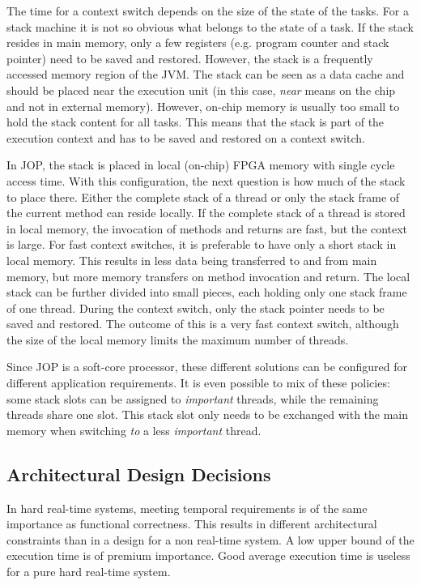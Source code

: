 The time for a context switch depends on the size of the state of
the tasks. For a stack machine it is not so obvious what belongs to
the state of a task. If the stack resides in main memory, only a few
registers (e.g. program counter and stack pointer) need to be saved
and restored. However, the stack is a frequently accessed memory
region of the JVM. The stack can be seen as a data cache and should
be placed near the execution unit (in this case, \emph{near} means
on the chip and not in external memory). However, on-chip memory is
usually too small to hold the stack content for all tasks. This
means that the stack is part of the execution context and has to be
saved and restored on a context switch.

In JOP, the stack is placed in local (on-chip) FPGA memory with
single cycle access time. With this configuration, the next question
is how much of the stack to place there. Either the complete stack
of a thread or only the stack frame of the current method can reside
locally. If the complete stack of a thread is stored in local
memory, the invocation of methods and returns are fast, but the
context is large. For fast context switches, it is preferable to
have only a short stack in local memory. This results in less data
being transferred to and from main memory, but more memory transfers
on method invocation and return. The local stack can be further
divided into small pieces, each holding only one stack frame of one
thread. During the context switch, only the stack pointer needs to
be saved and restored. The outcome of this is a very fast context
switch, although the size of the local memory limits the maximum
number of threads.

Since JOP is a soft-core processor, these different solutions can be
configured for different application requirements. It is even
possible to mix of these policies: some stack slots can be assigned
to \emph{important} threads, while the remaining threads share one
slot. This stack slot only needs to be exchanged with the main
memory when switching \emph{to} a less \emph{important} thread.

\subsection{Architectural Design Decisions}

In hard real-time systems, meeting temporal requirements is of the
same importance as functional correctness. This results in different
architectural constraints than in a design for a non real-time
system. A low upper bound of the execution time is of premium
importance. Good average execution time is useless for a pure hard
real-time system.

